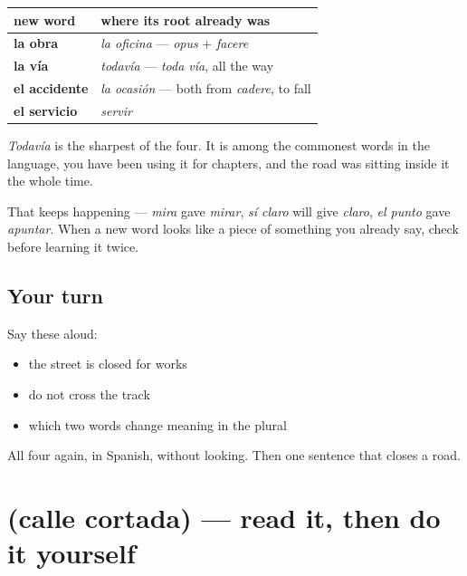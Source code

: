 \begin{grammarlens}[title={Grammar Lens: every one of the four was already in the corpus}]
\noindent
\begin{tabularx}{\linewidth}{@{}>{\raggedright\arraybackslash}X>{\raggedright\arraybackslash}X@{}}
\toprule
\textbf{new word} & \textbf{where its root already was} \\
\midrule
\textbf{la obra} & \emph{la oficina} — \emph{opus} + \emph{facere} \\
\textbf{la vía} & \emph{todavía} — \emph{toda vía}, all the way \\
\textbf{el accidente} & \emph{la ocasión} — both from \emph{cadere}, to fall \\
\textbf{el servicio} & \emph{servir} \\
\bottomrule
\end{tabularx}

\emph{Todavía} is the sharpest of the four. It is among the commonest words in the language, you have been using it for chapters, and the road was sitting inside it the whole time.

That keeps happening — \emph{mira} gave \emph{mirar}, \emph{sí claro} will give \emph{claro}, \emph{el punto} gave \emph{apuntar}. When a new word looks like a piece of something you already say, check before learning it twice.
\end{grammarlens}

\subsection*{Your turn}
Say these aloud:

\begin{itemize}
\raggedright
  \item the street is closed for works
  \item do not cross the track
  \item which two words change meaning in the plural
\end{itemize}

\begin{tcolorbox}[breakable,colback=teal!4,colframe=teal!35!black,title={Before you move on}]
All four again, in Spanish, without looking. Then one sentence that closes a road.
\end{tcolorbox}
\section[Practice]{(calle cortada) — read it, then do it yourself}

